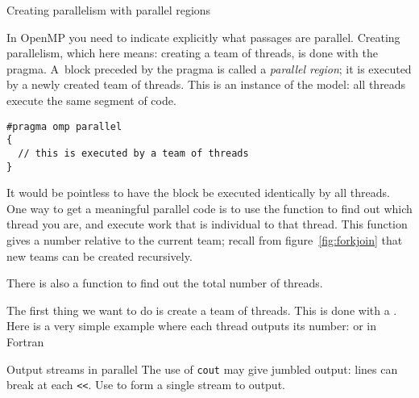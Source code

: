 

 {Creating parallelism with parallel regions}

In OpenMP you need to indicate explicitly what passages are
parallel. Creating parallelism, which here means: creating a team of threads,
is done with the  pragma.
A~block preceded by the  pragma
is called a \emph{parallel region}; it
is executed by a newly created team of threads. 
This is an instance of the  model: all threads execute the same
segment of code.
\begin{lstlisting}
#pragma omp parallel
{
  // this is executed by a team of threads
}
\end{lstlisting}

It would be pointless to have the block be executed identically by
all threads.
One way to get a meaningful parallel code is to use the function
 to find out which thread you are,
and execute work that is individual to that thread.
This function gives a number relative to the current team;
recall from figure~\ref{fig:forkjoin} that new teams can be created recursively.

There is also a function
 to find out the total number of threads.

The first thing we want to do is create a team of threads. This
is done with a .
Here is a very simple example where each thread
outputs its number:
or in Fortran

\begin{cppnote}{Output streams in parallel}
  \label{sl:par-stringstream}
  The use of \lstinline{cout} may give jumbled output: lines can
  break at each \verb+<<+.
  Use  to form a single stream to output.
  
\end{cppnote}

